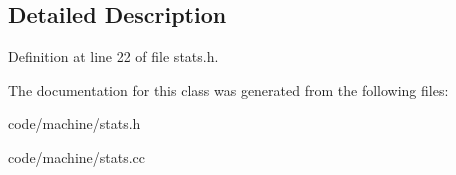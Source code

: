 \subsection{Detailed Description}


Definition at line 22 of file stats.\+h.



The documentation for this class was generated from the following files\+:\begin{DoxyCompactItemize}
\item 
code/machine/stats.\+h\item 
code/machine/stats.\+cc\end{DoxyCompactItemize}
